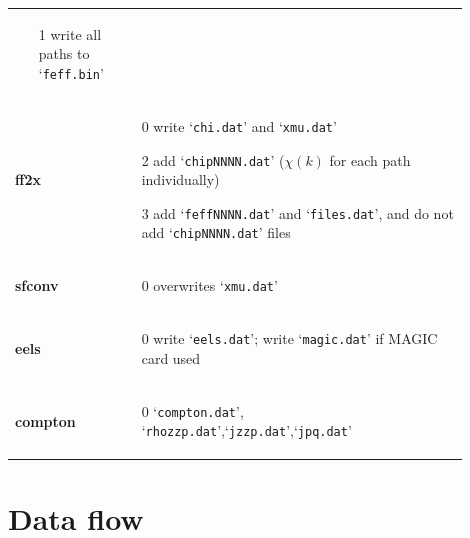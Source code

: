\documentclass[11pt,oneside]{report} %
\newcommand{\file}[1]{`\texttt{#1}'}
\newcommand{\module}[1]{\textrm{\bf{#1}}}
\begin{document}
\begin{latexonly}
\begin{table}[htbp]
\begin{center}
\begin{tabular}[h]{p{0.1\linewidth}p{0.8\linewidth}}
\begin{itemize}
      \item[1] write all paths to \file{feff.bin}
      \end{itemize}\\
      \module{ff2x} &
      \vspace{-4ex}
      \begin{itemize}
        \tightlist
      \item[0] write \file{chi.dat} and \file{xmu.dat}
      \item[2] add \file{chipNNNN.dat} ($\chi(k)$ for each path individually)
      \item[3] add \file{feffNNNN.dat} and \file{files.dat}, and do not add \file{chipNNNN.dat} files
      \end{itemize}\\
      \module{sfconv} &
      \vspace{-4ex}
      \begin{itemize}
        \tightlist
      \item[0] overwrites \file{xmu.dat}
      \end{itemize}\\
      \module{eels} &
      \vspace{-4ex}
      \begin{itemize}
        \tightlist
      \item[0] write \file{eels.dat}; write \file{magic.dat} if MAGIC card used
      \end{itemize}\\
      \module{compton} &
      \vspace{-4ex}
      \begin{itemize}
        \tightlist
      \item[0] \file{compton.dat}, \file{rhozzp.dat},\file{jzzp.dat},\file{jpq.dat}
      \end{itemize}\\      
      \hline\hline
    \end{tabular}
    \label{tab:printlevels}
    \end{center}
\end{table}

\newpage

\section{Data flow}
\label{sec:File-structure-code}


\end{latexonly}
\end{document}
